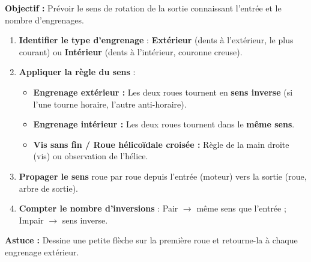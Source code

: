 \documentclass[11pt]{article}
\begin{document}
\begin{methode}
    \textbf{Objectif :} Prévoir le sens de rotation de la sortie connaissant l'entrée et le nombre d'engrenages.
    \begin{enumerate}
        \item \textbf{Identifier le type d'engrenage} : \textbf{Extérieur} (dents à l'extérieur, le plus courant) ou \textbf{Intérieur} (dents à l'intérieur, couronne creuse).
        \item \textbf{Appliquer la règle du sens} :
              \begin{itemize}
                  \item \textbf{Engrenage extérieur :} Les deux roues tournent en \textbf{sens inverse} (si l'une tourne horaire, l'autre anti-horaire).
                  \item \textbf{Engrenage intérieur :} Les deux roues tournent dans le \textbf{même sens}.
                  \item \textbf{Vis sans fin / Roue hélicoïdale croisée :} Règle de la main droite (vis) ou observation de l'hélice.
              \end{itemize}
        \item \textbf{Propager le sens} roue par roue depuis l'entrée (moteur) vers la sortie (roue, arbre de sortie).
        \item \textbf{Compter le nombre d'inversions} : Pair $\rightarrow$ même sens que l'entrée ; Impair $\rightarrow$ sens inverse.
    \end{enumerate}
    \textbf{Astuce :} Dessine une petite flèche sur la première roue et retourne-la à chaque engrenage extérieur.
\end{methode}
\end{document}
